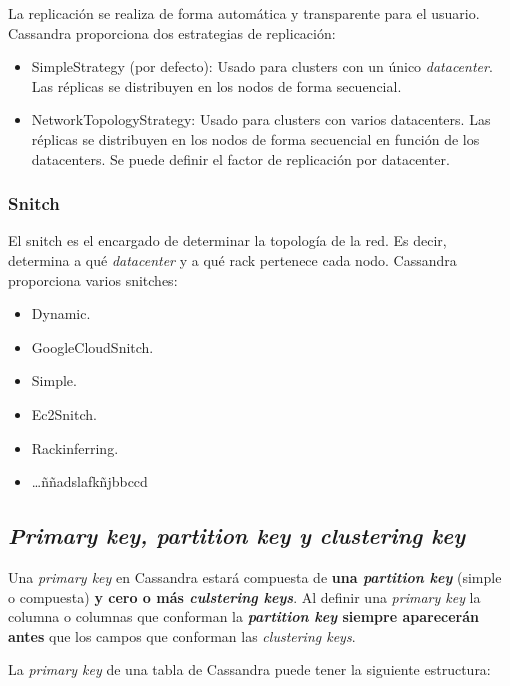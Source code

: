 \documentclass[
]{book}
\providecommand{\tightlist}{%
  \setlength{\itemsep}{0pt}\setlength{\parskip}{0pt}}
\begin{document}
La replicación se realiza de forma automática y transparente para el usuario. Cassandra proporciona dos estrategias de replicación:

\begin{itemize}
\tightlist
\item
  SimpleStrategy (por defecto): Usado para clusters con un único \emph{datacenter}. Las réplicas se distribuyen en los nodos de forma secuencial.
\item
  NetworkTopologyStrategy: Usado para clusters con varios datacenters. Las réplicas se distribuyen en los nodos de forma secuencial en función de los datacenters. Se puede definir el factor de replicación por datacenter.
\end{itemize}

\subsubsection{Snitch}\label{snitch}

El snitch es el encargado de determinar la topología de la red. Es decir, determina a qué \emph{datacenter} y a qué rack pertenece cada nodo. Cassandra proporciona varios snitches:

\begin{itemize}
\tightlist
\item
  Dynamic.
\item
  GoogleCloudSnitch.
\item
  Simple.
\item
  Ec2Snitch.
\item
  Rackinferring.
\item
  \ldots ññadslafkñjbbccd
\end{itemize}

\subsection{\texorpdfstring{\emph{Primary key, partition key y clustering key}}{Primary key, partition key y clustering key}}\label{primary-key-partition-key-y-clustering-key}

Una \emph{primary key} en Cassandra estará compuesta de \textbf{una \emph{partition key}} (simple o compuesta) \textbf{y cero o más \emph{culstering keys}}. Al definir una \emph{primary key} la columna o columnas que conforman la \textbf{\emph{partition key} siempre aparecerán antes} que los campos que conforman las \emph{clustering keys}.

La \emph{primary key} de una tabla de Cassandra puede tener la siguiente estructura:
\end{document}
